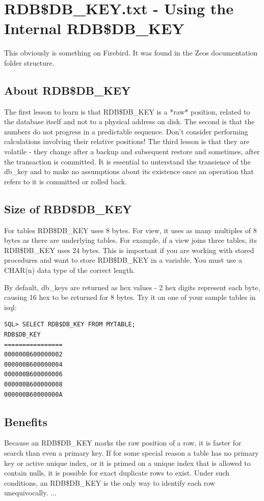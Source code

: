 \documentclass[a4paper,12pt,oneside]{book}
\begin{document}
\chapter{RDB\$DB\_KEY.txt - Using the Internal RDB\$DB\_KEY}

This obviously is something on Firebird. It was found in the Zeos documentation folder structure.

\section{About RDB\$DB\_KEY}
The first lesson to learn is that RDB\$DB\_KEY is a *raw* position, related to the database
itself and not to a physical address on disk. The second is that the numbers do not
progress in a predictable sequence. Don't consider performing calculations involving
their relative positions! The third lesson is that they are volatile - they change after a
backup and subsequent restore and sometimes, after the transaction is committed. It is
essential to unterstand the transience of the db\_key and to make no assumptions about its
existence once an operation that refers to it is committed or rolled back.

\section{Size of RBD\$DB\_KEY}
For tables RDB\$DB\_KEY uses 8 bytes. For view, it uses as many multiples of 8 bytes as
there are underlying tables. For example, if a view joins three tables, its RDB\$DB\_KEY uses
24 bytes. This is important if you are working with stored procedures and want to store
RDB\$DB\_KEY in a variable. You must use a CHAR(n) data type of the correct length.

By default, db\_keys are returned as hex values - 2 hex digits represent each byte, causing
16 hex to be returned for 8 bytes. Try it on one of your sample tables in isql:

\begin{verbatim}
SQL> SELECT RDB$DB_KEY FROM MYTABLE;
RDB$DB_KEY
================
000000B600000002
000000B600000004
000000B600000006
000000B600000008
000000B60000000A
\end{verbatim}

\section{Benefits}
Because an RDB\$DB\_KEY marks the raw position of a row, it is faster for search than even
a primary key. If for some special reason a table has no primary key or active unique
index, or it is primed on a unique index that is allowed to contain nulls, it is possible
for exact duplicate rows to exist. Under such conditions, an RDB\$DB\_KEY is the only way
to identify each row unequivocally. ...
\end{document}
